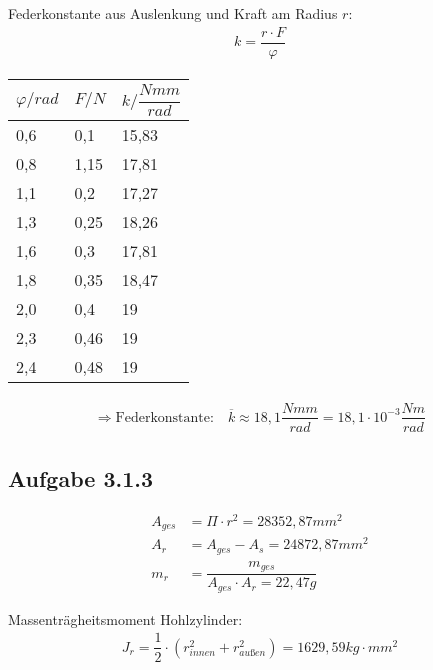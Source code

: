 \documentclass[a4paper]{scrartcl}
\begin{document}
Federkonstante aus Auslenkung und Kraft am Radius $r$:
\begin{align}
k = \dfrac{r \cdot F}{\varphi}
\end{align}

\begin{table}[]
\begin{tabular}{|l|l|l|}
\hline
\textbf{$\varphi/rad$} & \textbf{$F/N$} & \textbf{$k/\dfrac{Nmm}{rad}$} \\ \hline
0,6                    & 0,1            & 15,83                         \\ \hline
0,8                    & 1,15           & 17,81                         \\ \hline
1,1                    & 0,2            & 17,27                         \\ \hline
1,3                    & 0,25           & 18,26                         \\ \hline
1,6                    & 0,3            & 17,81                         \\ \hline
1,8                    & 0,35           & 18,47                         \\ \hline
2,0                    & 0,4            & 19                            \\ \hline
2,3                    & 0,46           & 19                            \\ \hline
2,4                    & 0,48           & 19                            \\ \hline
\end{tabular}
\end{table}

\begin{align*}
\Rightarrow \text{Federkonstante:} \quad \overline{k} \approx 18,1 \dfrac{Nmm}{rad} = 18,1 \cdot 10^{-3} \dfrac{Nm}{rad}
\end{align*}

\subsection{Aufgabe 3.1.3}

\begin{align}
A_{ges} &= \Pi \cdot r^2 = 28352,87mm^2 \\
A_r &= A_{ges} - A_s = 24872,87mm^2 \\
m_r &= \dfrac{m_{ges}}{A_{ges} \cdot A_r = 22,47g}
\end{align}

Massenträgheitsmoment Hohlzylinder:
\begin{align}
J_r = \dfrac{1}{2} \cdot (r_{\textit{innen}}^2 + r_{\textit{außen}}^2) = 1629,59 kg \cdot mm^2
\end{align}
\end{document}
